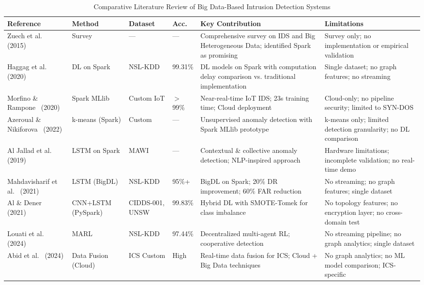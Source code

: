 \documentclass[conference]{IEEEtran}
\begin{document}
\begin{table}[t]
\centering
\caption{Comparative Literature Review of Big Data-Based Intrusion Detection Systems}
\label{tab:literature}
\begin{adjustbox}{max width=\textwidth}
\begin{tabular}{p{2.8cm}p{2.2cm}p{1.8cm}p{1.2cm}p{4.5cm}p{4.5cm}}
\toprule
\textbf{Reference} & \textbf{Method} & \textbf{Dataset} & \textbf{Acc.} & \textbf{Key Contribution} & \textbf{Limitations} \\
\midrule
Zuech et al.~\cite{b1} (2015) & Survey & --- & --- & Comprehensive survey on IDS and Big Heterogeneous Data; identified Spark as promising & Survey only; no implementation or empirical validation \\
\midrule
Haggag et al.~\cite{b2} (2020) & DL on Spark & NSL-KDD & 99.31\% & DL models on Spark with computation delay comparison vs. traditional implementation & Single dataset; no graph features; no streaming \\
\midrule
Morfino \& Rampone~\cite{b3} (2020) & Spark MLlib & Custom IoT & $>$99\% & Near-real-time IoT IDS; 23s training time; Cloud deployment & Cloud-only; no pipeline security; limited to SYN-DOS \\
\midrule
Azeroual \& Nikiforova~\cite{b4} (2022) & k-means (Spark) & Custom & --- & Unsupervised anomaly detection with Spark MLlib prototype & k-means only; limited detection granularity; no DL comparison \\
\midrule
Al Jallad et al.~\cite{b5} (2019) & LSTM on Spark & MAWI & --- & Contextual \& collective anomaly detection; NLP-inspired approach & Hardware limitations; incomplete validation; no real-time demo \\
\midrule
Mahdavisharif et al.~\cite{b6} (2021) & LSTM (BigDL) & NSL-KDD & 95\%+ & BigDL on Spark; 20\% DR improvement; 60\% FAR reduction & No streaming; no graph features; single dataset \\
\midrule
Al \& Dener~\cite{b7} (2021) & CNN+LSTM (PySpark) & CIDDS-001, UNSW & 99.83\% & Hybrid DL with SMOTE-Tomek for class imbalance & No topology features; no encryption layer; no cross-domain test \\
\midrule
Louati et al.~\cite{b8} (2024) & MARL & NSL-KDD & 97.44\% & Decentralized multi-agent RL; cooperative detection & No streaming pipeline; no graph analytics; single dataset \\
\midrule
Abid et al.~\cite{b9} (2024) & Data Fusion (Cloud) & ICS Custom & High & Real-time data fusion for ICS; Cloud + Big Data techniques & No graph analytics; no ML model comparison; ICS-specific \\

\end{tabular}
\end{adjustbox}
\end{table}
\end{document}
